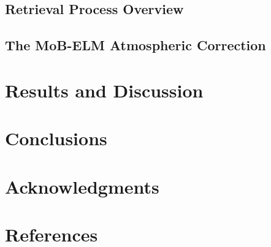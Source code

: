\documentclass[onecolumn,3p,letterpaper,11pt,draft]{elsarticle}
\begin{document}
\subsection{Retrieval Process Overview}

\subsection{The MoB-ELM Atmospheric Correction}

\section{Results and Discussion}
\label{sec:Results}



\section{Conclusions}

\section*{Acknowledgments}
\vspace{-.2cm}

\section*{References}


%
\end{document}
